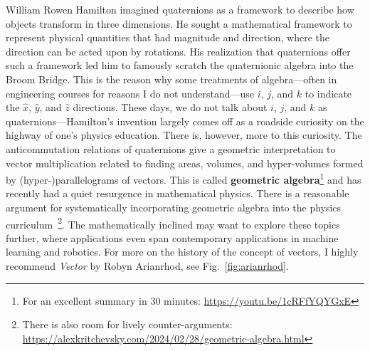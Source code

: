 \begin{subappendices}
William Rowen Hamilton imagined quaternions as a framework to describe how objects transform in three dimensions. He sought a mathematical framework to represent physical quantities that had magnitude and direction, where the direction can be acted upon by rotations. His realization that quaternions offer such a framework led him to famously scratch the quaternionic algebra into the Broom Bridge. This is the reason why some treatments of algebra---often in engineering courses for reasons I do not understand---use $i$, $j$, and $k$ to indicate the $\hat x$, $\hat y$, and $\hat z$ directions. These days, we do not talk about $i$, $j$, and $k$ as quaternions---Hamilton's invention largely comes off as a roadside curiosity on the highway of one's physics education. There is, however, more to this curiosity. The anticommutation relations of quaternions give a geometric interpretation to vector multiplication related to finding areas, volumes, and hyper-volumes formed by (hyper-)parallelograms of vectors. This is called \textbf{geometric algebra}\footnote{For an excellent summary in 30 minutes: \url{https://youtu.be/1cRFfYQYGxE}} and has recently had a quiet resurgence in mathematical physics. There is a reasonable argument for systematically incorporating geometric algebra into the physics curriculum~\autocite{Doran:2007tqa}\footnote{There is also room for lively counter-arguments: \url{https://alexkritchevsky.com/2024/02/28/geometric-algebra.html}}. The mathematically inclined may want to explore these topics further,\autocite{chisolm2012geometricalgebra,chappell2016geometricalgebranaturalrepresentation,brechet2022rotationsclassicalmechanicsusing,lundholm2009cliffordalgebrageometricalgebra,brechet2022electrodynamicsgeometricalgebra,Lasenby:2019gmi,almeida2005geometricalgebraparticledynamics} where applications even span contemporary applications in machine learning and robotics.\autocite{hitzer2013introductioncliffordsgeometricalgebra} For more on the history of the concept of vectors, I highly recommend \emph{Vector} by Robyn Arianrhod, see Fig.~\ref{fig:arianrhod}.
\begin{marginfigure}%

\end{marginfigure}
\end{subappendices}
